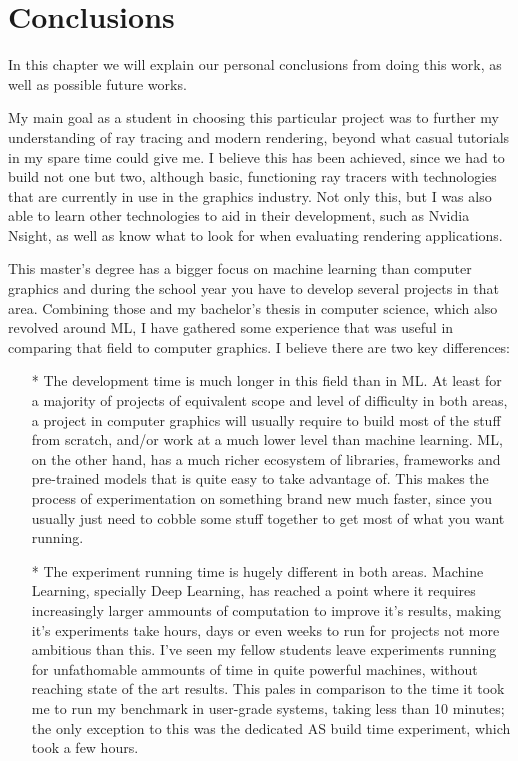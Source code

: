 \chapter{Conclusions}

In this chapter we will explain our personal conclusions from doing this work, as well as possible future works.

My main goal as a student in choosing this particular project was to further my understanding of ray tracing and modern rendering, beyond what casual tutorials in my spare time could give me. I believe this has been achieved, since we had to build not one but two, although basic, functioning ray tracers with technologies that are currently in use in the graphics industry. Not only this, but I was also able to learn other technologies to aid in their development, such as Nvidia Nsight, as well as know what to look for when evaluating rendering applications.

This master's degree has a bigger focus on machine learning than computer graphics and during the school year you have to develop several projects in that area. Combining those and my bachelor's thesis in computer science, which also revolved around ML, I have gathered some experience that was useful in comparing that field to computer graphics. I believe there are two key differences:

\begin{itemize}
  \item[*]{The development time is much longer in this field than in ML. At least for a majority of projects of equivalent scope and level of difficulty in both areas, a project in computer graphics will usually require to build most of the stuff from scratch, and/or work at a much lower level than machine learning. ML, on the other hand, has a much richer ecosystem of libraries, frameworks and pre-trained models that is quite easy to take advantage of. This makes the process of experimentation on something brand new much faster, since you usually just need to cobble some stuff together to get most of what you want running.}
  \item[*]{The experiment running time is hugely different in both areas. Machine Learning, specially Deep Learning, has reached a point where it requires increasingly larger ammounts of computation to improve it's results, making it's experiments take hours, days or even weeks to run for projects not more ambitious than this. I've seen my fellow students leave experiments running for unfathomable ammounts of time in quite powerful machines, without reaching state of the art results. This pales in comparison to the time it took me to run my benchmark in user-grade systems, taking less than 10 minutes; the only exception to this was the dedicated AS build time experiment, which took a few hours.}
\end{itemize}

